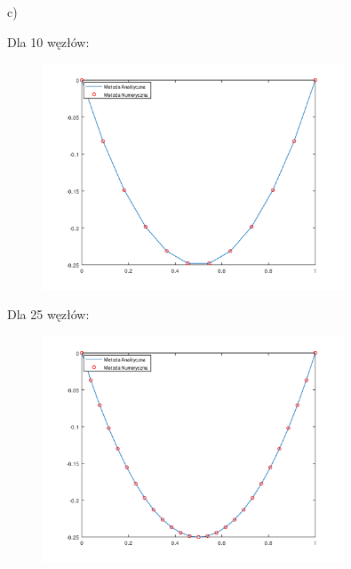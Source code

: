 \newpage
c)\\
\begin{samepage}
    Dla 10 węzłów:
    \FloatBarrier
    \begin{figure}[!ht]
        \begin{center}
            \includegraphics[width=0.8\textwidth]{Lab4/charts/zad3/zad3_n_10.png}
        \end{center}
    \end{figure}
    \FloatBarrier
\end{samepage}

\begin{samepage}
    Dla 25 węzłów:
    \begin{figure}[!ht]
        \begin{center}
            \includegraphics[width=0.8\textwidth]{Lab4/charts/zad3/zad3_n_25.png}
        \end{center}
    \end{figure}
    \FloatBarrier
\end{samepage}

